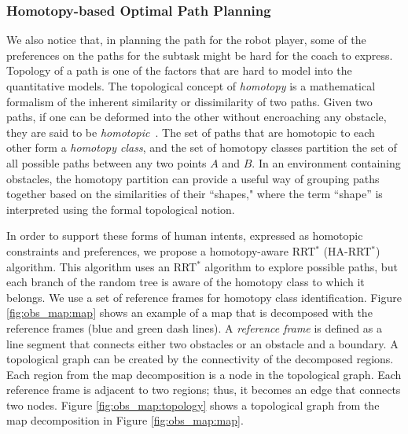 \documentclass[phd]{byuprop}
\begin{document}
\subsubsection{Homotopy-based Optimal Path Planning}
\label{sec:homotopy_based_path_planning}

We also notice that, in planning the path for the robot player, some of the preferences on the paths for the subtask might be hard for the coach to express.
Topology of a path is one of the factors that are hard to model into the quantitative models.
The topological concept of \emph{homotopy} is a mathematical formalism of the inherent similarity or dissimilarity of two paths.
Given two paths, if one can be deformed into the other without encroaching any obstacle, they are said to be \emph{homotopic}~\cite{Hernandez2015}.
The set of paths that are homotopic to each other form a \emph{homotopy class}, and the  set of homotopy classes partition the set of all possible paths between any two points $A$ and $B$.
In an environment containing obstacles, the homotopy partition can provide a useful way of grouping paths together based on the similarities of their ``shapes," where the term ``shape'' is interpreted using the formal topological notion.

In order to support these forms of human intents, expressed as homotopic constraints and preferences, we propose a homotopy-aware RRT$^{*}$ (HA-RRT$^{*}$) algorithm. 
This algorithm uses an RRT$^*$ algorithm to explore possible paths, but each branch of the random tree is aware of the homotopy class to which it belongs. 
We use a set of reference frames for homotopy class identification.
Figure \ref{fig:obs_map:map} shows an example of a map that is decomposed with the reference frames (blue and green dash lines).
A \emph{reference frame} is defined as a line segment that connects either two obstacles or an obstacle and a boundary.
A topological graph can be created by the connectivity of the decomposed regions.
Each region from the map decomposition is a node in the topological graph.
Each reference frame is adjacent to two regions; thus, it becomes an edge that connects two nodes.
Figure \ref{fig:obs_map:topology} shows a topological graph from the map decomposition in Figure \ref{fig:obs_map:map}.
\end{document}
